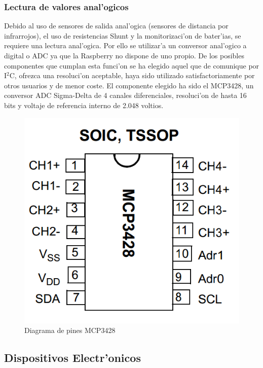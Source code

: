 \documentclass[twoside,12pt]{article}
\begin{document}
\subsubsection{Lectura de valores anal'ogicos}
Debido al uso de sensores de salida anal'ogica (sensores de distancia por infrarrojos), el uso de resistencias Shunt y la monitorizaci'on de bater'ias, se requiere una lectura anal'ogica. Por ello se utilizar'a un conversor anal'ogico a digital o ADC ya que la Raspberry no dispone de uno propio. De los posibles componentes que cumplan esta funci'on se ha elegido aquel que de comunique por I$^{2}$C, ofrezca una resoluci'on aceptable, haya sido utilizado satisfactoriamente por otros usuarios y de menor coste. El componente elegido ha sido el MCP3428, un conversor ADC Sigma-Delta de 4 canales diferenciales, resoluci'on de hasta 16 bits y voltaje de referencia interno de 2.048 voltios.

\begin{figure}[ht]
\centering
\includegraphics[scale=0.30]{images/MCP3428_pin_diagram.png}
\caption{Diagrama de pines MCP3428}
\label{fig:LM3914}
\end{figure} 

\subsection{Dispositivos Electr'onicos}
\end{document}

